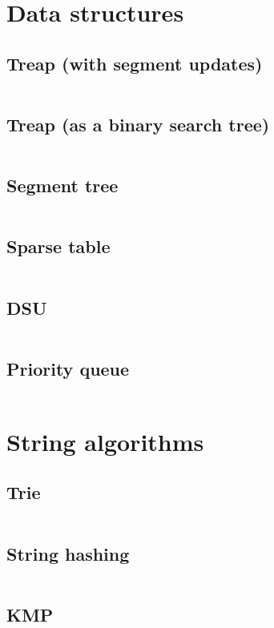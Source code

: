 ﻿\documentclass[10pt,twocolumn,oneside]{article}
\begin{document}
\section{Data structures}
\subsection{Treap (with segment updates)}
\inputminted[breaklines]{cpp}{Data structures/treap (segment updates).cpp}
\subsection{Treap (as a binary search tree)}
\inputminted[breaklines]{cpp}{Data structures/treap (as a binsearch tree).cpp}
\subsection{Segment tree}
\inputminted[breaklines]{cpp}{Data structures/segment tree.cpp}
\subsection{Sparse table}
\inputminted[breaklines]{cpp}{Data structures/sparse table.cpp}
\subsection{DSU}
\inputminted[breaklines]{cpp}{Data structures/dsu.cpp}
\subsection{Priority queue}
\inputminted[breaklines]{python}{Data structures/priority queue.py}

\section{String algorithms}
\subsection{Trie}
\inputminted[breaklines]{cpp}{String algorithms/trie.cpp}
\subsection{String hashing}
\inputminted[breaklines]{cpp}{String algorithms/string hashing.cpp}
\subsection{KMP}
\inputminted[breaklines]{python}{String algorithms/kmp.py}
\end{document}
